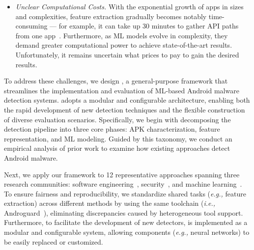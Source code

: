 \begin{itemize}[leftmargin=10pt, itemsep=2pt]
  \item \textit{Unclear Computational Costs.}
  With the exponential growth of apps in sizes and complexities, feature extraction gradually becomes notably time-consuming --- for example, it can take up 30 minutes to gather API paths from one app~\cite{xu2020sdac}.
  Furthermore, as ML models evolve in complexity, they demand greater computational power to achieve state-of-the-art results.
  Unfortunately, it remains uncertain what prices to pay to gain the desired results.
\end{itemize}


To address these challenges, we design \codename, a general-purpose framework that streamlines the implementation and evaluation of ML-based Android malware detection systems.
\codename adopts a modular and configurable architecture, enabling both the rapid development of new detection techniques and the flexible construction of diverse evaluation scenarios.
Specifically, we begin with decomposing the detection pipeline into three core phases: APK characterization, feature representation, and ML modeling.
Guided by this taxonomy, we conduct an empirical analysis of prior work to examine how existing approaches detect Android malware.

Next, we apply our framework to 12 representative approaches spanning three research communities: software engineering~\cite{wu2019malscan,wu2021homdroid,wu2021android}, security~\cite{arp2014drebin,mariconti2016mamadroid,mclaughlin2017deep,xu2018deeprefiner,kim2018multimodal,xu2020sdac,he2022msdroid}, and machine learning~\cite{hou2017hindroid,li2021robust}.
To ensure fairness and reproducibility, we standardize shared tasks (\textit{e.g.,} feature extraction) across different methods by using the same toolchain (\textit{i.e.,} Androguard~\cite{androguard}), eliminating discrepancies caused by heterogeneous tool support.
Furthermore, to facilitate the development of new detectors, \codename is implemented as a modular and configurable system, allowing components (\textit{e.g.,} neural networks) to be easily replaced or customized.

